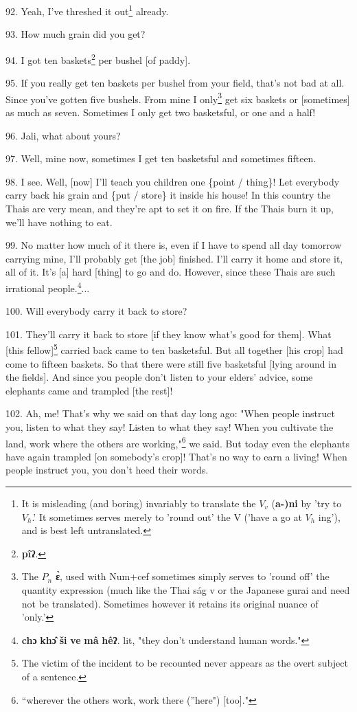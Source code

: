 92. Yeah, I've threshed it out\footnote{It is misleading (and boring) invariably to translate the $V_v$ (\textbf{a-)ni} by 'try to $V_h$.' It sometimes serves merely to 'round out' the V ('have a go at $V_h$ ing'), and is best left untranslated.} already.

93. How much grain did you get?

94. I got ten baskets\footnote{\textbf{pîʔ}.} per bushel [of paddy].

95. If you really get ten baskets per bushel from your field, that's not bad at
all. Since you've gotten five bushels. From mine I only\footnote{The $P_n$ \textbf{ɛ̀}, used with Num+cef sometimes simply serves to 'round off' the quantity expression (much like the Thai ság v or the Japanese gurai and need not be translated). Sometimes however it retains its original nuance of 'only.'} get six baskets or
[sometimes] as much as seven. Sometimes I only get two basketsful, or one and a
half!

96. Jali, what about yours?

97. Well, mine now, sometimes I get ten basketsful and sometimes fifteen.

98. I see. Well, [now] I'll teach you children one \{point / thing\}! Let everybody
carry back his grain and \{put / store\} it inside his house! In this country the
Thais are very mean, and they're apt to set it on fire. If the Thais burn it up,
we'll have nothing to eat.

99. No matter how much of it there is, even if I have to spend all day tomorrow
carrying mine, I'll probably get [the job] finished. I'll carry it home and store
it, all of it. It's [a] hard [thing] to go and do. However, since these Thais are
such irrational people.\footnote{\textbf{chɔ} \textbf{khɔ̂} \textbf{ši} \textbf{ve} \textbf{mâ} \textbf{hêʔ}. lit, "they don't understand human words."}...

100. Will everybody carry it back to store?

101. They'll carry it back to store [if they know what's good for them]. What [this
fellow]\footnote{The victim of the incident to be recounted never appears as the overt subject of a sentence.}\textbf{ }carried back came to ten basketsful. But all together [his
crop] had come to fifteen baskets. So that there were still five basketsful [lying
around in the fields]. And since you people don't listen to your elders' advice,
some elephants came and trampled [the rest]!

102. Ah, me! That's why we said on that day long ago: "When people instruct
you, listen to what they say! Listen to what they say! When you cultivate the land,
work where the others are working,"\footnote{``wherever the others work, work there (''here") [too]."} we said. But today even the elephants
have again trampled [on somebody's crop]! That's no way to earn a living! When
people instruct you, you don't heed their words.

